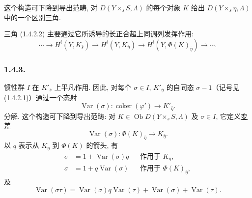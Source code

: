 这个构造可下降到导出范畴, 对 $D(Y\times_sS,\Lambda)$ 的每个对象 $K$ 给出 $D(Y\times_s\eta,\Lambda)$ 中的一个区别三角.

三角 (1.4.2.2) 主要通过它所诱导的长正合超上同调列发挥作用:
\begin{equation*}
\cdots\longrightarrow H^i(\bar Y,K_{\bar s})
\longrightarrow H^i(\bar Y,K_{\bar\eta})
\longrightarrow H^i(\bar Y,\Phi(K)_{\bar\eta})
\longrightarrow\cdots.
\end{equation*}

\subsubsection*{1.4.3.}
惯性群 $I$ 在 $K'_{\bar s}$ 上平凡作用. 因此, 对每个 $\sigma\in I$, $K'_{\bar\eta}$ 的自同态 $\sigma-1$（记号见 (1.4.2.1)）通过一个态射
\begin{equation*}
\operatorname{Var}(\sigma):
\operatorname{coker}(\varphi')\longrightarrow K'_{\bar\eta}.
\end{equation*}
分解. 这个构造可下降到导出范畴: 对 $K\in\operatorname{Ob}D(Y\times_sS,\Lambda)$ 及 $\sigma\in I$, 它定义\underline{变差}
\begin{equation}\tag{1.4.3.1}
\operatorname{Var}(\sigma):
\Phi(K)_{\bar\eta}\longrightarrow K_{\bar\eta}.
\end{equation}
以 $q$ 表示从 $K_\eta$ 到 $\Phi(K)$ 的箭头, 有
\begin{align}\tag{1.4.3.2}
\sigma&=1+\operatorname{Var}(\sigma)q
&&\text{作用于 }K_{\bar\eta},\\
\tag{1.4.3.3}
\sigma&=1+q\operatorname{Var}(\sigma)
&&\text{作用于 }\Phi(K)_{\bar\eta},
\end{align}
及
\begin{equation}\tag{1.4.3.4}
\operatorname{Var}(\sigma\tau)
=\operatorname{Var}(\sigma)q\operatorname{Var}(\tau)
 +\operatorname{Var}(\sigma)+\operatorname{Var}(\tau).
\end{equation}
